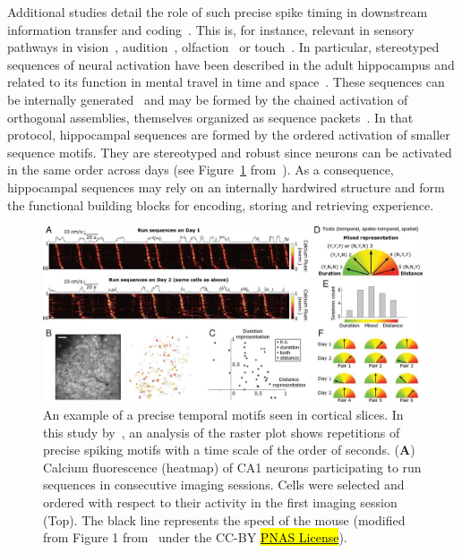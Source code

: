 \documentclass[brainsci, %
               review,accept,pdftex,moreauthors
               ]{Definitions/mdpi}
\begin{document}
Additional studies detail the role of such precise spike timing in downstream information transfer and coding~\citep{villette_internally_2015,branco_dendritic_2010,luczak_packet-based_2015}. This is, for instance, relevant in sensory pathways in vision~\citep{meister_concerted_1995}, audition~\citep{decharms_primary_1996}, olfaction~\citep{cleland_construction_2014, kashiwadani_synchronized_1999, rinberg_speed-accuracy_2006} or touch~\citep{johansson_first_2004}.  In particular, stereotyped sequences of neural activation have been described in the adult hippocampus and related to its function in mental travel in time and space~\citep{buzsaki_space_2018}. These sequences can be internally generated~\citep{pastalkova_internally_2008,villette_internally_2015} and may be formed by the chained activation of orthogonal assemblies, themselves organized as sequence packets~\citep{malvache_awake_2016}. In that protocol, hippocampal sequences are formed by the ordered activation of smaller sequence motifs. They are stereotyped and robust since neurons can be activated in the same order across days (see Figure~\ref{fig:haimerl} from~\citep{haimerl_internal_2019}). As a consequence, hippocampal sequences may rely on an internally hardwired structure and form the functional building blocks for encoding, storing and retrieving experience.
%
\begin{figure}[H]
\includegraphics[width=0.98\linewidth]{figures/haimerl2019.jpg}
\caption{
        An example of a precise temporal motifs seen in cortical slices. 
        In this study by~\citep{haimerl_internal_2019}, an analysis of the raster plot shows repetitions of precise spiking motifs with a time scale of the order of seconds. (\textbf{A}) Calcium fluorescence (heatmap) of CA1 neurons participating to run sequences in consecutive imaging sessions. Cells were selected and ordered with respect to their activity in the first imaging session (Top). The black line represents the speed of the mouse (modified from Figure 1 from~\citep{haimerl_internal_2019} under the CC-BY \href{https://www.pnas.org/doi/full/10.1073/pnas.1718518116}{\hl{PNAS License}}).}\label{fig:haimerl}  %

\end{figure}
\end{document}
